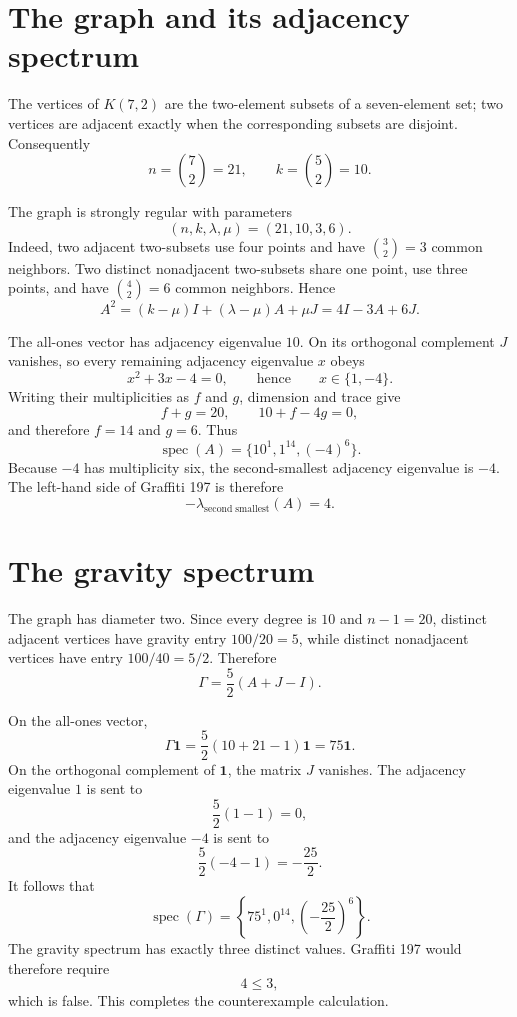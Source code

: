 \documentclass[11pt]{article}
\begin{document}
\section{The graph and its adjacency spectrum}

The vertices of $K(7,2)$ are the two-element subsets of a seven-element set;
two vertices are adjacent exactly when the corresponding subsets are disjoint.
Consequently
\[
 n=\binom72=21,
 \qquad
 k=\binom52=10.
\]

The graph is strongly regular with parameters
\[
 (n,k,\lambda,\mu)=(21,10,3,6).
\]
Indeed, two adjacent two-subsets use four points and have
$\binom32=3$ common neighbors.  Two distinct nonadjacent two-subsets share one
point, use three points, and have $\binom42=6$ common neighbors.  Hence
\[
 A^2=(k-\mu)I+(\lambda-\mu)A+\mu J
     =4I-3A+6J.
\]

The all-ones vector has adjacency eigenvalue $10$.  On its orthogonal
complement $J$ vanishes, so every remaining adjacency eigenvalue $x$ obeys
\[
 x^2+3x-4=0,
 \qquad\text{hence}\qquad x\in\{1,-4\}.
\]
Writing their multiplicities as $f$ and $g$, dimension and trace give
\[
 f+g=20,
 \qquad
 10+f-4g=0,
\]
and therefore $f=14$ and $g=6$.  Thus
\[
 \operatorname{spec}(A)=\{10^1,1^{14},(-4)^6\}.
\]
Because $-4$ has multiplicity six, the second-smallest adjacency eigenvalue is
$-4$.  The left-hand side of Graffiti 197 is therefore
\[
 -\lambda_{\mathrm{second\;smallest}}(A)=4.
\]

\section{The gravity spectrum}

The graph has diameter two.  Since every degree is $10$ and $n-1=20$,
distinct adjacent vertices have gravity entry $100/20=5$, while distinct
nonadjacent vertices have entry $100/40=5/2$.  Therefore
\[
 \Gamma=\frac52(A+J-I).
\]

On the all-ones vector,
\[
 \Gamma\mathbf{1}
 =\frac52(10+21-1)\mathbf{1}
 =75\mathbf{1}.
\]
On the orthogonal complement of $\mathbf{1}$, the matrix $J$ vanishes.  The
adjacency eigenvalue $1$ is sent to
\[
 \frac52(1-1)=0,
\]
and the adjacency eigenvalue $-4$ is sent to
\[
 \frac52(-4-1)=-\frac{25}{2}.
\]
It follows that
\[
 \operatorname{spec}(\Gamma)
 =\left\{75^1,0^{14},\left(-\frac{25}{2}\right)^6\right\}.
\]
The gravity spectrum has exactly three distinct values.  Graffiti 197 would
therefore require
\[
 4\leq3,
\]
which is false.  This completes the counterexample calculation.
\end{document}
